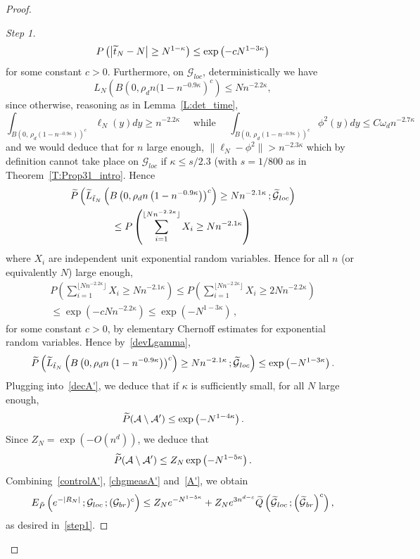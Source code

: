 \documentclass[10pt]{amsart}
\theoremstyle{definition}\newtheorem{defi}[theo]{Definition}\newtheorem{rema}[theo]{Remark}\newtheorem{exam}[theo]{Example}\newtheorem{exem}[theo]{Example}\newtheorem{nota}[theo]{Notation}
\newenvironment{step}[1]{\begin{proof}[#1]}{\let\qed\relax\end{proof}}
\newcommand{\Pmh}{P}
\newcommand*\E {{E}}
\newcommand{\cA}{\mathcal{A}}
\newcommand{\cG}{\mathcal{G}}
\newcommand*\Q{{Q}}
\newcommand*\eps{\varepsilon}
\let\oldtilde\tilde
\renewcommand*{\tilde}[1]{\mathchoice{\widetilde{#1}}{\widetilde{#1}}{\oldtilde{#1}}{\oldtilde{#1}}}\let\oldhat\hat
\renewcommand*{\hat}[1]{\mathchoice{\widehat{#1}}{\widehat{#1}}{\oldhat{#1}}{\oldhat{#1}}}\let\oldexists\exists
\renewcommand*{\exists}{\mathrel{\oldexists}}
\begin{document}
\begin{proof}
\begin{step}{Step 1}
\begin{equation}\label{devtN}
\Pmh\left(\left|\tilde t_N - N\right| \ge N^{1- \kappa}\right) \le \exp\left(- c N^{1- 3 \kappa}\right)
\end{equation}
for some constant $c>0$. Furthermore, on $\cG_{loc}$, deterministically we have
\[
L_N \left(B\left(0, \rho_d n (1- n^{ - 0.9 \kappa}\right)^c\right) \le N n^{-2.2 \kappa},
\]
since otherwise, reasoning as in Lemma~\ref{L:det_time},
\[
\int_{B(0,\,\rho_d (1- n^{ - 0.9 \kappa}))^c} \ell_N (y) dy \ge n^{-2.2 \kappa}\quad\text{ while }\quad\int_{B(0,\,\rho_d (1- n^{ - 0.9 \kappa}))^c} \phi^2(y) dy \le C \omega_d n^{- 2.7 \kappa}
\]
and we would deduce that for $n$ large enough, $\| \ell_N - \phi^2\| >n^{-2.3\kappa}$ which by definition cannot take place on $\cG_{loc}$ if $\kappa \le s/2.3$ (with $s = 1/800 $ as in Theorem~\ref{T:Prop31_intro}. Hence
\begin{multline}\label{devLgamma}
\tilde \Pmh \left(\tilde L_{\tilde t_N} \left(B\left(0, \rho_d n\left(1- n^{ - 0.9 \kappa}\right)\right)^c\right) \ge Nn^{- 2.1 \kappa}\,; \tilde \cG_{loc}\right)\\
\le \Pmh\left(\sum_{i=1}^{ \lfloor Nn^{-2.2 \kappa}\rfloor } X_i \ge Nn^{- 2.1\kappa}\right)
\end{multline}
where $X_i$ are independent unit exponential random variables. Hence for all $n$ (or equivalently $N$) large enough,
\begin{multline*}
\Pmh\left(\sum_{i=1}^{ \lfloor Nn^{-2.2 \kappa}\rfloor } X_i \ge Nn^{-2.1 \kappa}\right) \le
\Pmh\left(\sum_{i=1}^{ \lfloor Nn^{-2.2 \kappa}\rfloor } X_i \ge 2 Nn^{-2.2 \kappa}\right) \\
\le \exp \left(- c N n^{-2.2 \kappa}\right) \le \exp \left(- N^{1 - 3\kappa}\right)\,,
\end{multline*}
for some constant $c>0$, by elementary Chernoff estimates for exponential random variables. Hence by~\eqref{devLgamma},
\[
\tilde \Pmh \left(\tilde L_{\tilde t_N} \left(B\left(0, \rho_d n\left(1- n^{ - 0.9 \kappa}\right)\right)^c\right) \ge Nn^{-2.1 \kappa}\,; \tilde \cG_{loc}\right) \le \exp\left(- N^{1- 3 \kappa}\right).
\]
Plugging into~\eqref{decA'}, we deduce that if $\kappa$ is sufficiently small, for all $N$ large enough,
\[
\tilde \Pmh(\cA \setminus \cA') \le \exp \left(- N^{1 - 4 \kappa}\right).
\]
Since $Z_N = \exp (- O(n^d))$, we deduce that
\begin{equation}\label{controlA'}
\tilde \Pmh(\cA \setminus \cA') \le Z_N \exp\left(- N^{1- 5 \kappa}\right).
\end{equation}
Combining~\eqref{controlA'}, \eqref{chgmeasA'} and~\eqref{A'}, we obtain
\[
\E_{\tilde \Pmh} \left(e^{- |R_N|}\,; \cG_{loc}\,; (\cG_{br})^c\right) \le Z_N e^{- N^{1- 5 \kappa}} + Z_N e^{3 n^{d- \eps}} \tilde \Q\left(\tilde \cG_{loc}\,; \left(\tilde \cG_{br}\right)^c\right),
\]
as desired in~\eqref{step1}.
\end{step}


\end{proof}
\end{document}
